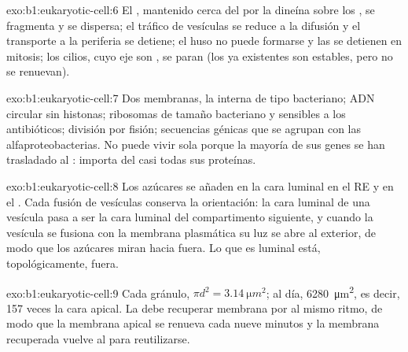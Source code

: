 \begin{solution}{exo:b1:eukaryotic-cell:6}
El , mantenido cerca del  por la dineína sobre los
, se fragmenta y se dispersa; el tráfico de vesículas se reduce
a la difusión y el transporte a la periferia se detiene; el huso no puede
formarse y las  se detienen en mitosis; los cilios, cuyo eje son
, se paran (los ya existentes son estables, pero no se
renuevan).
\end{solution}

\begin{solution}{exo:b1:eukaryotic-cell:7}
Dos membranas, la interna de tipo bacteriano; ADN circular sin histonas;
ribosomas de tamaño bacteriano y sensibles a los antibióticos; división por
fisión; secuencias génicas que se agrupan con las alfaproteobacterias. No
puede vivir sola porque la mayoría de sus genes se han trasladado al :
importa del  casi todas sus proteínas.
\end{solution}

\begin{solution}{exo:b1:eukaryotic-cell:8}
Los azúcares se añaden en la cara luminal en el RE y en el . Cada
fusión de vesículas conserva la orientación: la cara luminal de una vesícula
pasa a ser la cara luminal del compartimento siguiente, y cuando la vesícula
se fusiona con la membrana plasmática su luz se abre al exterior, de modo
que los azúcares miran hacia fuera. Lo que es luminal está, topológicamente,
fuera.
\end{solution}

\begin{solution}{exo:b1:eukaryotic-cell:9}
Cada gránulo, $\pi d^2 = \qty{3.14}{\micro m^2}$; al día,
\qty{6280}{\micro m^2}, es decir, \qty{157}{} veces la cara apical. La
 debe recuperar membrana por  al mismo ritmo, de modo que
la membrana apical se renueva cada nueve minutos y la membrana recuperada
vuelve al  para reutilizarse.
\end{solution}

